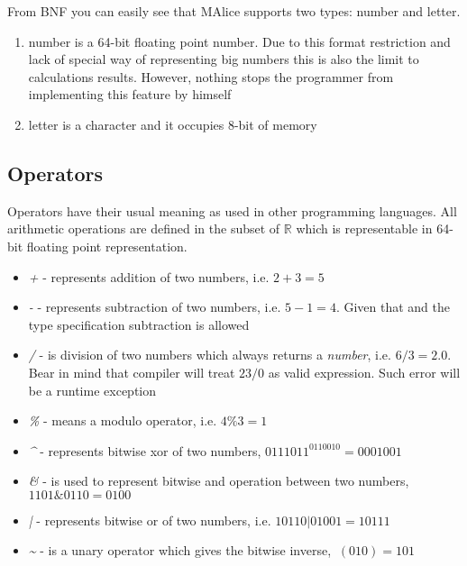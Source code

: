 \documentclass[a4wide, 11pt]{article}
\begin{document}
From BNF you can easily see that MAlice supports two types: number and letter.

\begin{enumerate}
     \item
     number is a 64-bit floating point number. Due to this format restriction and lack of special way of representing big numbers this is also the limit to calculations results. However, nothing stops the programmer from implementing this feature by himself

     \item
     letter is a character and it occupies 8-bit of memory

\end{enumerate}

\subsection{Operators}

Operators have their usual meaning as used in other programming languages. All arithmetic operations are defined in the subset of $\mathbb{R}$ which is representable in 64-bit floating point representation.

\begin{itemize}

    \item
    \textit{+} - represents addition of two numbers, i.e. $ 2 + 3 = 5 $

    \item
    \textit{-} - represents subtraction of two numbers, i.e. $ 5 - 1 = 4 $. Given that and the type specification subtraction is allowed 

    \item
    \textit{/} - is division of two numbers which always returns a \emph{number}, i.e. $ 6 / 3 = 2.0 $. Bear in mind that compiler will treat $ 23 / 0 $ as valid expression. Such error will be a runtime exception

    \item
    \textit{\%} - means a modulo operator, i.e. $ 4 \% 3 = 1 $

    \item
    \textit{\^} - represents bitwise xor of two numbers, $ 0111011 ^ 0110010 = 0001001 $

    \item
    \textit{\&} - is used to represent bitwise and operation between two numbers,  $ 1101 \& 0110 = 0100 $

    \item
    \textit{|} - represents bitwise or of two numbers, i.e. $ 10110 | 01001 = 10111 $

    \item
    \textit{\~} - is a unary operator which gives the bitwise inverse, $ ~(010) = 101 $
    
\end{itemize}
\end{document}
